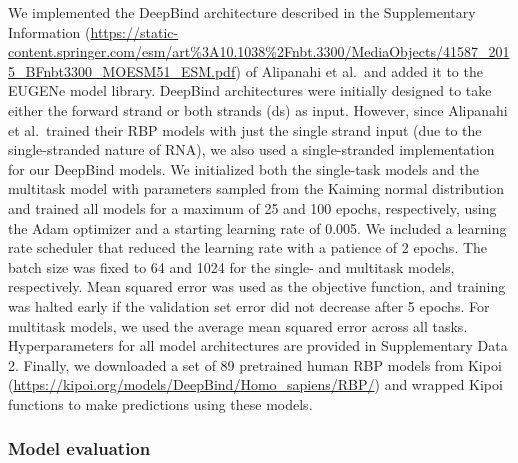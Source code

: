 We implemented the DeepBind architecture described in the Supplementary Information (\url{https://static-content.springer.com/esm/art%3A10.1038%2Fnbt.3300/MediaObjects/41587_2015_BFnbt3300_MOESM51_ESM.pdf}) of Alipanahi et al.\ and added it to the EUGENe model library. DeepBind architectures were initially designed to take either the forward strand or both strands (ds) as input. However, since Alipanahi et al.\ trained their RBP models with just the single strand input (due to the single-stranded nature of RNA), we also used a single-stranded implementation for our DeepBind models. We initialized both the single-task models and the multitask model with parameters sampled from the Kaiming normal distribution\cite{He2015-qh} and trained all models for a maximum of 25 and 100 epochs, respectively, using the Adam optimizer\cite{Kingma2014-kn} and a starting learning rate of 0.005. We included a learning rate scheduler that reduced the learning rate with a patience of 2 epochs. The batch size was fixed to 64 and 1024 for the single- and multitask models, respectively. Mean squared error was used as the objective function, and training was halted early if the validation set error did not decrease after 5 epochs. For multitask models, we used the average mean squared error across all tasks. Hyperparameters for all model architectures are provided in Supplementary Data 2. Finally, we downloaded a set of 89 pretrained human RBP models from Kipoi (\url{https://kipoi.org/models/DeepBind/Homo_sapiens/RBP/}) and wrapped Kipoi functions to make predictions using these models.

\subsubsection{Model evaluation}

